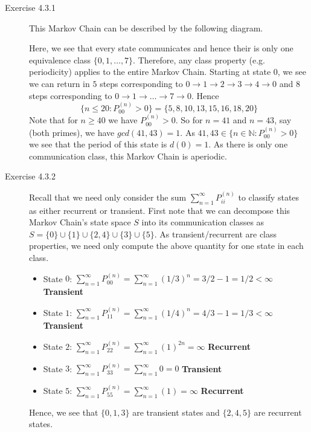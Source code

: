 \documentclass[12pt]{article}  %
\newcommand{\N}{{\mathbb{N}}}
\begin{document}
\begin{description}
\item[Exercise 4.3.1] This Markov Chain can be described by the following diagram. 


Here, we see that every state communicates and hence their is only one equivalence class $\{0,1,\ldots, 7\}$. Therefore, any class property (e.g. periodicity) applies to the entire Markov Chain. Starting at state $0$, we see we can return in $5$ steps corresponding to $0\to1\to2\to3\to4\to0$ and 8 steps corresponding to $0\to1\to\dots\to7\to0$. Hence $$\{n\leq 20: P_{00}^{(n)}>0\} = \{5,8,10,13,15,16,18,20\}$$
Note that for $n\geq 40$ we have $P_{00}^{(n)}>0$. So for $n = 41$ and $n=43$, say (both primes), we have $gcd(41,43) = 1$. As $41,43\in\{n\in\N:P_{00}^{(n)}>0\}$ we see that the period of this state is $d(0)=1$. As there is only one communication class, this Markov Chain is aperiodic. 

\item[Exercise 4.3.2] Recall that we need only consider the sum $\sum_{n=1}^{\infty}P_{ii}^{(n)}$ to classify states as either recurrent or transient. First note that we can decompose this Markov Chain's state space $S$ into its communication classes as $S = \{0\}\cup\{1\}\cup\{2,4\}\cup\{3\}\cup\{5\}$. As transient/recurrent are class properties, we need only compute the above quantity for one state in each class. 
\begin{itemize}
\item State $0$: $\sum_{n=1}^{\infty}P_{00}^{(n)} = \sum_{n=1}^{\infty} (1/3)^n = 3/2 - 1 = 1/2<\infty$ \textbf{Transient}
\item State $1$: $\sum_{n=1}^{\infty}P_{11}^{(n)} = \sum_{n=1}^{\infty} (1/4)^n = 4/3 - 1 = 1/3<\infty$ \textbf{Transient}
\item State $2$: $\sum_{n=1}^{\infty}P_{22}^{(n)} = \sum_{n=1}^{\infty} (1)^{2n} = \infty$ \textbf{Recurrent}
\item State $3$: $\sum_{n=1}^{\infty}P_{33}^{(n)} = \sum_{n=1}^{\infty} 0 = 0$ \textbf{Transient}
\item State $5$: $\sum_{n=1}^{\infty}P_{55}^{(n)} = \sum_{n=1}^{\infty} (1) = \infty$ \textbf{Recurrent}
\end{itemize}
Hence, we see that $\{0,1,3\}$ are transient states and $\{2,4,5\}$ are recurrent states. 


\end{description}
\end{document}
